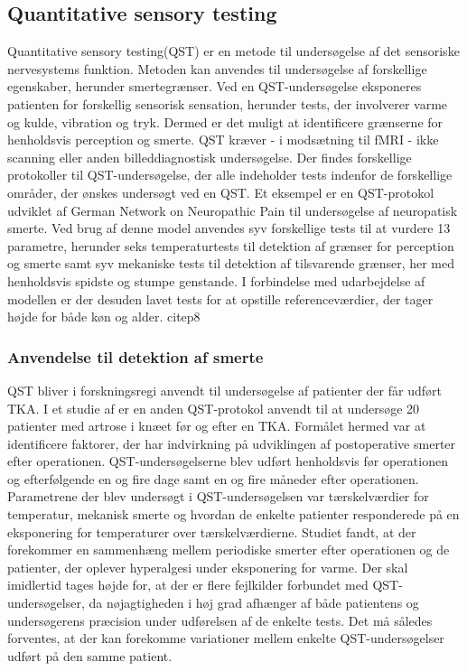 \subsection{Quantitative sensory testing}
Quantitative sensory testing(QST) er en metode til undersøgelse af det sensoriske nervesystems funktion. Metoden kan anvendes til undersøgelse af forskellige egenskaber, herunder smertegrænser. Ved en QST-undersøgelse eksponeres patienten for forskellig sensorisk sensation, herunder tests, der involverer varme og kulde, vibration og tryk. Dermed er det muligt at identificere grænserne for henholdsvis perception og smerte. \citep{Yarnitsky2006} QST kræver - i modsætning til fMRI - ikke scanning eller anden billeddiagnostisk undersøgelse. 
Der findes forskellige protokoller til QST-undersøgelse, der alle indeholder tests indenfor de forskellige områder, der ønskes undersøgt ved en QST. Et eksempel er en QST-protokol udviklet af German Network on Neuropathic Pain til undersøgelse af neuropatisk smerte. Ved brug af denne model anvendes syv forskellige tests til at vurdere 13 parametre, herunder seks temperaturtests til detektion af grænser for perception og smerte samt syv mekaniske tests til detektion af tilsvarende grænser, her med henholdsvis spidste og stumpe genstande. I forbindelse med udarbejdelse af modellen er der desuden lavet tests for at opstille referenceværdier, der tager højde for både køn og alder. citep{8}  

\subsubsection{Anvendelse til detektion af smerte}
QST bliver i forskningsregi anvendt til undersøgelse af patienter der får udført TKA. I et studie af \citep{Martinez2007} er en anden QST-protokol anvendt til at undersøge 20 patienter med artrose i knæet før og efter en TKA. Formålet hermed var at identificere faktorer, der har indvirkning på udviklingen af postoperative smerter efter operationen. QST-undersøgelserne blev udført henholdsvis før operationen og efterfølgende en og fire dage samt en og fire måneder efter operationen. Parametrene der blev undersøgt i QST-undersøgelsen var tærskelværdier for temperatur, mekanisk smerte og hvordan de enkelte patienter responderede på en eksponering for temperaturer over tærskelværdierne. Studiet fandt, at der forekommer en sammenhæng mellem periodiske smerter efter operationen og de patienter, der oplever hyperalgesi under eksponering for varme. \citep{Martinez2007} Der skal imidlertid tages højde for, at der er flere fejlkilder forbundet med QST-undersøgelser, da nøjagtigheden i høj grad afhænger af både patientens og undersøgerens præcision under udførelsen af de enkelte tests. Det må således forventes, at der kan forekomme variationer mellem enkelte QST-undersøgelser udført på den samme patient. \citep{Yarnitsky2006}


